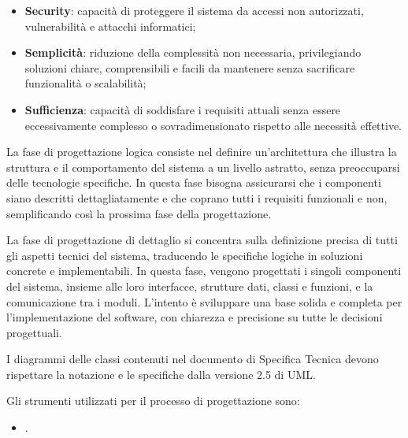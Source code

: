 \begin{itemize}
    \item \textbf{Security}: capacità di proteggere il sistema da accessi non autorizzati, vulnerabilità e attacchi informatici;
    \item \textbf{Semplicità}: riduzione della complessità non necessaria, privilegiando soluzioni chiare, comprensibili e facili da mantenere senza sacrificare funzionalità o scalabilità;
    \item \textbf{Sufficienza}: capacità di soddisfare i requisiti attuali senza essere eccessivamente complesso o sovradimensionato rispetto alle necessità effettive.
\end{itemize}

La fase di progettazione logica consiste nel definire un'architettura che illustra la struttura e il comportamento del sistema a un livello astratto, senza preoccuparsi delle tecnologie specifiche. In questa fase bisogna assicurarsi che i componenti siano descritti dettagliatamente e che coprano tutti i requisiti funzionali e non, semplificando così la prossima fase della progettazione.

La fase di progettazione di dettaglio si concentra sulla definizione precisa di tutti gli aspetti tecnici del sistema, traducendo le specifiche logiche in soluzioni concrete e implementabili. In questa fase, vengono progettati i singoli componenti del sistema, insieme alle loro interfacce, strutture dati, classi e funzioni, e la comunicazione tra i moduli. L'intento è sviluppare una base solida e completa per l'implementazione del software, con chiarezza e precisione su tutte le decisioni progettuali.

I diagrammi delle classi contenuti nel documento di Specifica Tecnica devono rispettare la notazione e le specifiche dalla versione 2.5 di UML.

Gli strumenti utilizzati per il processo di progettazione sono:
\begin{itemize}
    \item {}.
\end{itemize}

